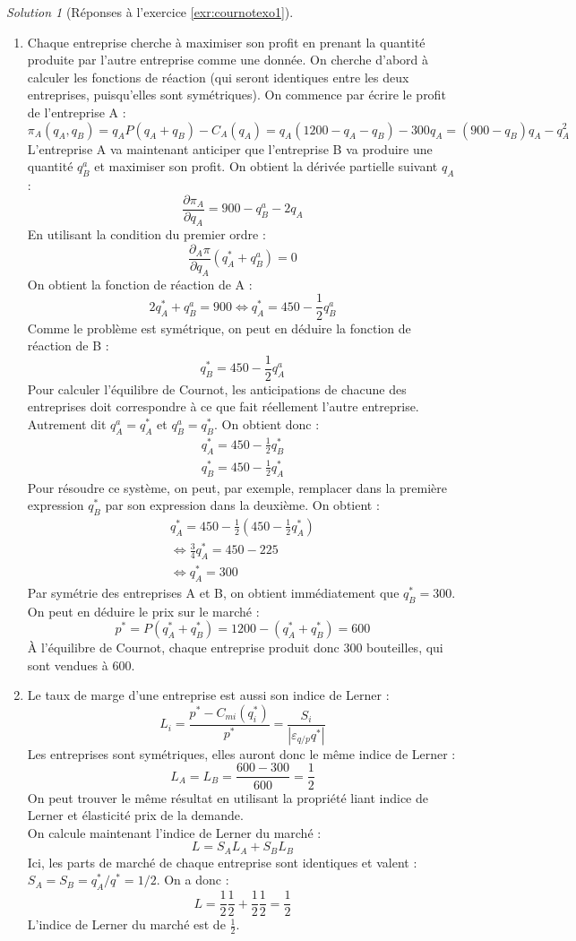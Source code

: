 \documentclass[
]{book}
\providecommand{\tightlist}{%
  \setlength{\itemsep}{0pt}\setlength{\parskip}{0pt}}
\theoremstyle{definition}
\theoremstyle{definition}
\theoremstyle{definition}
\theoremstyle{definition}
\theoremstyle{remark}
\newtheorem*{solution}{Solution}
\begin{document}
\begin{solution}[Réponses à l'exercice \ref{exr:cournotexo1}]
\begin{enumerate}
\def\labelenumi{\arabic{enumi}.}
\tightlist
\item
  Chaque entreprise cherche à maximiser son profit en prenant la quantité produite par l'autre entreprise comme une donnée.
  On cherche d'abord à calculer les fonctions de réaction (qui seront identiques entre les deux entreprises, puisqu'elles sont symétriques).
  On commence par écrire le profit de l'entreprise A :
  \[\pi_A(q_A, q_B)=q_AP(q_A+q_B)-C_A(q_A)=q_A(1200-q_A-q_B)-300q_A=(900-q_B)q_A-q_A^2\]
  L'entreprise A va maintenant anticiper que l'entreprise B va produire une quantité \(q_B^a\) et maximiser son profit.
  On obtient la dérivée partielle suivant \(q_A\) :
  \[\frac{\partial\pi_A}{\partial q_A}=900-q_B^a-2q_A\]
  En utilisant la condition du premier ordre :
  \[\frac{\partial_A\pi}{\partial q_A}(q_A^*+q_B^a)=0\]
  On obtient la fonction de réaction de A :
  \[2q_A^*+q_B^a=900\Leftrightarrow q_A^*=450-\frac{1}{2}q_B^a\]
  Comme le problème est symétrique, on peut en déduire la fonction de réaction de B :
  \[q_B^*=450-\frac{1}{2}q_A^a\]
  Pour calculer l'équilibre de Cournot, les anticipations de chacune des entreprises doit correspondre à ce que fait réellement l'autre entreprise.
  Autrement dit \(q_A^a=q_A^*\) et \(q_B^a=q_B^*\).
  On obtient donc :
  \begin{gather*}
  q_A^*=450-\frac{1}{2}q_B^*\\
  q_B^*=450-\frac{1}{2}q_A^*
  \end{gather*}
  Pour résoudre ce système, on peut, par exemple, remplacer dans la première expression \(q_B^*\) par son expression dans la deuxième.
  On obtient :
  \begin{gather*}
  q_A^*=450-\frac{1}{2}\left(450-\frac{1}{2}q_A^*\right) \\
  \Leftrightarrow \frac{3}{4}q_A^*=450-225\\
  \Leftrightarrow q_A^*=300
  \end{gather*}
  Par symétrie des entreprises A et B, on obtient immédiatement que \(q_B^*=300\).
  On peut en déduire le prix sur le marché :
  \[p^*=P(q_A^*+q_B^*)=1200-(q_A^*+q_B^*)=600\]
  À l'équilibre de Cournot, chaque entreprise produit donc 300 bouteilles, qui sont vendues à 600.
\item
  Le taux de marge d'une entreprise est aussi son indice de Lerner :
  \[L_i=\frac{p^*-C_{mi}(q_i^*)}{p^*}=\frac{S_i}{|\varepsilon_{q/p}{q^*}|}\]
  Les entreprises sont symétriques, elles auront donc le même indice de Lerner :
  \[L_A=L_B=\frac{600-300}{600}=\frac{1}{2}\]
  On peut trouver le même résultat en utilisant la propriété liant indice de Lerner et élasticité prix de la demande.\\
  On calcule maintenant l'indice de Lerner du marché :
  \[L=S_AL_A+S_BL_B\]
  Ici, les parts de marché de chaque entreprise sont identiques et valent : \(S_A=S_B=q_A^*/q^*=1/2\).
  On a donc :
  \[L=\frac{1}{2}\frac{1}{2}+\frac{1}{2}\frac{1}{2}=\frac{1}{2}\]
  L'indice de Lerner du marché est de \(\frac{1}{2}\).
\end{enumerate}

\end{solution}
\end{document}
